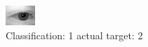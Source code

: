 \begin{figure}[h!]
\begin{center}
\includegraphics[width=0.60\columnwidth]{figures/ID433_class_1_target_2.png}
\end{center}
\caption{ Classification: 1 actual target: 2}
\label{fig:ID433_class_1_target_2}
\end{figure}
